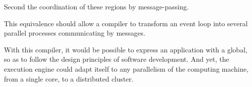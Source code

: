 Second the coordination of these regions by message-passing.








This equivalence should allow a compiler to transform an event loop into several parallel processes communicating by messages.

With this compiler, it would be possible to express an application with a global, so as to follow the design principles of software development.
And yet, the execution engine could adapt itself to any parallelism of the computing machine, from a single core, to a distributed cluster.




